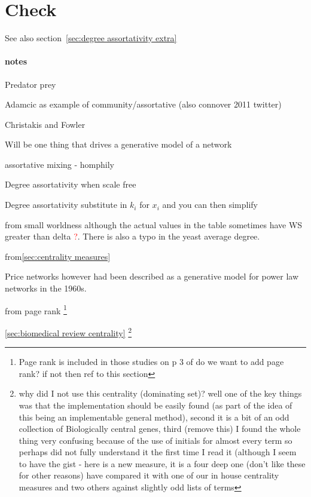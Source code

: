 \section{Check}

See also section~\ref{sec:degree assortativity extra}

\paragraph{notes}

Predator prey

Adamcic as example of community/assortative (also connover 2011 twitter)

Christakis and Fowler


Will be one thing that drives a generative model of a network

assortative mixing - homphily   

Degree assortativity when scale free

Degree assortativity substitute in $k_i$ for $x_i$ and you can then simplify


from small worldness
although the actual values in the table sometimes have WS greater than delta \textcolor{red}{?}. There is also a typo in the yeast average degree. 


from\ref{sec:centrality measures}

 Price networks however had been described as a generative model for power law networks in the 1960s\cite{price1965networks}. 


from page rank
 \footnote{Page rank is included in those studies on p 3 of \cite{kardos2020stability} do we want to add page rank? if not then ref to this section}
 
 
 
 \ref{sec:biomedical review centrality} \footnote{why did I not use this centrality (dominating set)? well one of the key things was that the implementation should be easily found (as part of the idea of this being an implementable general method), second it is a bit of an odd collection of Biologically central genes, third (remove this) I found the whole thing very confusing because of the use of initials for almost every term so perhaps did not fully understand it the first time I read it (although I seem to have the gist - here is a new measure, it is a four deep one (don't like these for other reasons) have compared it with one of our in house centrality measures and two others against slightly odd lists of terms}
 
